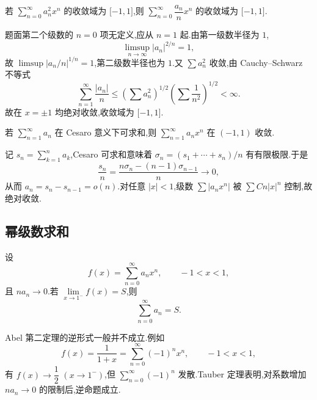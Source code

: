 \begin{example}
    若 $\displaystyle\sum\limits_{n=0}^{\infty}a_n^2x^n$ 的收敛域为 $\lbrack -1,1\rbrack$,则 $\displaystyle\sum\limits_{n=0}^{\infty}\dfrac{a_n}{n}x^n$ 的收敛域为 $\lbrack -1,1\rbrack$.
\end{example}
\exampleblank

\begin{solution}
    题面第二个级数的 $n=0$ 项无定义,应从 $n=1$ 起.由第一级数半径为 $1$,
    \[
        \limsup\limits_{n\to\infty}|a_n|^{2/n}=1,
    \]
    故 $\limsup|a_n/n|^{1/n}=1$,第二级数半径也为 $1$.又 $\sum a_n^2$ 收敛,由 Cauchy--Schwarz 不等式
    \[
        \sum\limits_{n=1}^{\infty}\dfrac{|a_n|}{n}
        \leq\left(\sum a_n^2\right)^{1/2}
        \left(\sum\dfrac{1}{n^2}\right)^{1/2}<\infty.
    \]
    故在 $x=\pm1$ 均绝对收敛,收敛域为 $\lbrack-1,1\rbrack$.
\end{solution}

\begin{example}
    若 $\displaystyle\sum\limits_{n=1}^{\infty}a_n$ 在 Cesaro 意义下可求和,则 $\displaystyle\sum\limits_{n=1}^{\infty}a_nx^n$ 在 $(-1,1)$ 收敛.
\end{example}
\exampleblank

\begin{solution}
    记 $s_n=\sum_{k=1}^na_k$,Cesaro 可求和意味着
    $\sigma_n=(s_1+\cdots+s_n)/n$ 有有限极限.于是
    \[
        \dfrac{s_n}{n}=\dfrac{n\sigma_n-(n-1)\sigma_{n-1}}{n}\longrightarrow0,
    \]
    从而 $a_n=s_n-s_{n-1}=o(n)$.对任意 $|x|<1$,级数
    $\sum |a_nx^n|$ 被 $\sum Cn|x|^n$ 控制,故绝对收敛.
\end{solution}



\subsection{幂级数求和}

\begin{theorem}[Tauber 定理 $*$]
    设
    \[
        f(x)=\sum\limits_{n=0}^{\infty}a_nx^n,
        \qquad -1<x<1,
    \]
    且 $na_n\to0$.若 $\displaystyle\lim\limits_{x\to1^-}f(x)=S$,则
    \[
        \sum\limits_{n=0}^{\infty}a_n=S.
    \]
\end{theorem}

\begin{remark}
    Abel 第二定理的逆形式一般并不成立.例如
    \[
        f(x)=\dfrac{1}{1+x}=\sum\limits_{n=0}^{\infty}(-1)^nx^n,
        \qquad -1<x<1,
    \]
    有 $f(x)\to\dfrac{1}{2}$ $(x\to1^-)$,但 $\displaystyle\sum\limits_{n=0}^{\infty}(-1)^n$ 发散.Tauber 定理表明,对系数增加 $na_n\to0$ 的限制后,逆命题成立.
\end{remark}

